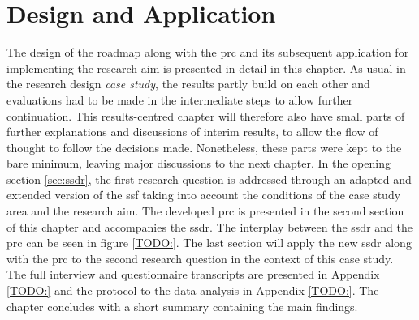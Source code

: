 
\chapter{Design and Application} %

\label{chapter4}

The design of the roadmap along with the \acrfull{prc} and its subsequent application for implementing the research aim is presented in detail in this chapter. As usual in the research design \textit{case study}, the results partly build on each other and evaluations had to be made in the intermediate steps to allow further continuation. This results-centred chapter will therefore also have small parts of further explanations and discussions of interim results, to allow the flow of thought to follow the decisions made. Nonetheless, these parts were kept to the bare minimum, leaving major discussions to the next chapter.\newline %
In the opening section \ref{sec:ssdr}, the first research question is addressed through an adapted and extended version of the \acrshort{ssf} taking into account the conditions of the case study area and the research aim. The developed \acrshort{prc} is presented in the second section of this chapter and accompanies the \acrfull{ssdr}. The interplay between the \acrshort{ssdr} and the \acrshort{prc} can be seen in figure \ref{TODO:}. The last section will apply the new \acrshort{ssdr} along with the \acrshort{prc} to the second research question in the context of this case study.\newline
The full interview and questionnaire transcripts are presented in Appendix \ref*{TODO:} and the protocol to the data analysis in Appendix \ref*{TODO:}. The chapter concludes with a short summary containing the main findings.


